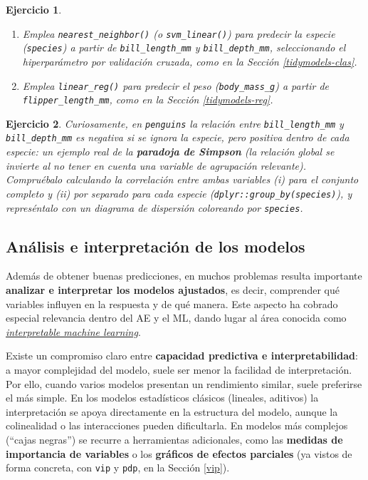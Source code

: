 \documentclass[
]{book}
\theoremstyle{break}
\newtheorem{exercise}{Ejercicio}[chapter]
\theoremstyle{nonumberplain}
\begin{document}
\begin{exercise}
\begin{enumerate}
\def\labelenumi{\alph{enumi})}
\item
  Emplea \texttt{nearest\_neighbor()} (o \texttt{svm\_linear()}) para predecir la especie (\texttt{species}) a partir de \texttt{bill\_length\_mm} y \texttt{bill\_depth\_mm}, seleccionando el hiperparámetro por validación cruzada, como en la Sección \ref{tidymodels-clas}.
\item
  Emplea \texttt{linear\_reg()} para predecir el peso (\texttt{body\_mass\_g}) a partir de \texttt{flipper\_length\_mm}, como en la Sección \ref{tidymodels-reg}.
\end{enumerate}

\end{exercise}

\begin{exercise}
\protect\hypertarget{exr:penguins-simpson}{}\label{exr:penguins-simpson}Curiosamente, en \texttt{penguins} la relación entre \texttt{bill\_length\_mm} y \texttt{bill\_depth\_mm} es negativa si se ignora la especie, pero positiva dentro de cada especie: un ejemplo real de la \textbf{paradoja de Simpson} (la relación global se invierte al no tener en cuenta una variable de agrupación relevante). Compruébalo calculando la correlación entre ambas variables (i) para el conjunto completo y (ii) por separado para cada especie (\texttt{dplyr::group\_by(species)}), y represéntalo con un diagrama de dispersión coloreando por \texttt{species}.
\end{exercise}

\subsection{Análisis e interpretación de los modelos}\label{analisis-modelos}

Además de obtener buenas predicciones, en muchos problemas resulta importante \textbf{analizar e interpretar los modelos ajustados}, es decir, comprender qué variables influyen en la respuesta y de qué manera. Este aspecto ha cobrado especial relevancia dentro del AE y el ML, dando lugar al área conocida como \href{https://christophm.github.io/interpretable-ml-book/}{\emph{interpretable machine learning}}.

Existe un compromiso claro entre \textbf{capacidad predictiva e interpretabilidad}: a mayor complejidad del modelo, suele ser menor la facilidad de interpretación. Por ello, cuando varios modelos presentan un rendimiento similar, suele preferirse el más simple. En los modelos estadísticos clásicos (lineales, aditivos) la interpretación se apoya directamente en la estructura del modelo, aunque la colinealidad o las interacciones pueden dificultarla. En modelos más complejos (``cajas negras'') se recurre a herramientas adicionales, como las \textbf{medidas de importancia de variables} o los \textbf{gráficos de efectos parciales} (ya vistos de forma concreta, con \texttt{vip} y \texttt{pdp}, en la Sección \ref{vip}).
\end{document}
